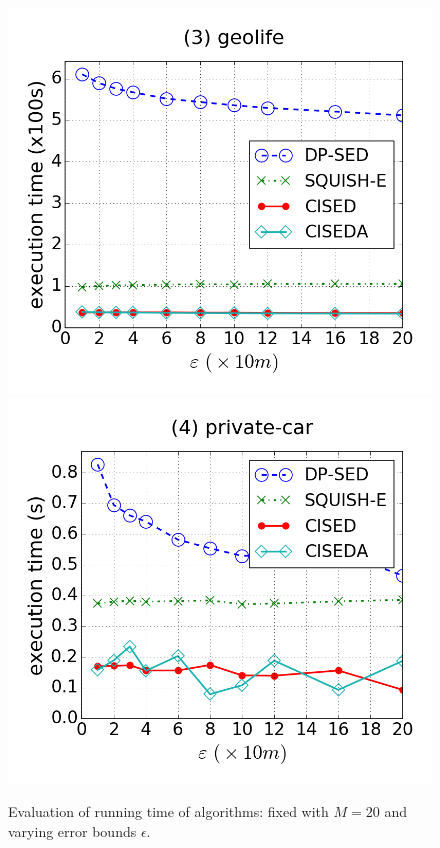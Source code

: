 \begin{figure}[tb!]
\includegraphics[scale = 0.250]{figures/Exp-time-epsilon-geolife.png}
\includegraphics[scale = 0.250]{figures/Exp-time-epsilon-private.png}
\vspace{-2ex}
\caption{\small Evaluation of running time of \lsa algorithms: fixed with $M=20$ and varying error bounds $\epsilon$.}
\label{fig:time-epsilon}
\vspace{-2ex}
\end{figure}



